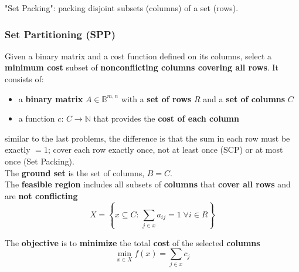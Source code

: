 "Set Packing": packing disjoint subsets (columns) of a set (rows).\\

\newpage

\subsubsection{Set Partitioning (SPP)}
Given a binary matrix and a cost function defined on its columns, select a \textbf{minimum cost} subset of \textbf{nonconflicting columns covering all rows}. It consists of:
\begin{itemize}
	\item a \textbf{binary matrix} $A \in \mathbb{B}^{m,n}$ with a \textbf{set of rows} $R$ and a \textbf{set of
		columns} $C$
	\item a function $c : \, C \rightarrow \mathbb{N}$ that provides the \textbf{cost of each column}
\end{itemize}
similar to the last problems, the difference is that the sum in each row must be exactly $= 1$; cover each row exactly once, not at least once (SCP) or at most once (Set Packing).\\

The \textbf{ground set} is the set of columns, $B = C$.\\

The \textbf{feasible region} includes all subsets of \textbf{columns} that \textbf{cover all rows} and are \textbf{not conflicting}
$$ X = \left\{x \subseteq C : \, \sum_{j \in x} a_{ij} = 1 \; \forall i \in R \right\}$$

The \textbf{objective} is to \textbf{minimize} the total \textbf{cost} of the selected \textbf{columns}
$$ \min_{x \in X} f(x) = \sum_{j \in x} c_j $$

\newpage

